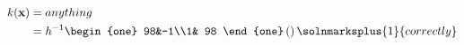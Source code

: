 \begin{align*}k(\mathbf{x})&=anything \\
&=h^{-1}\begin{one}
98&-1\\1& 98
\end{one}\left(\right)\solnmarksplus{1}{correctly}\\
\end{align*}
